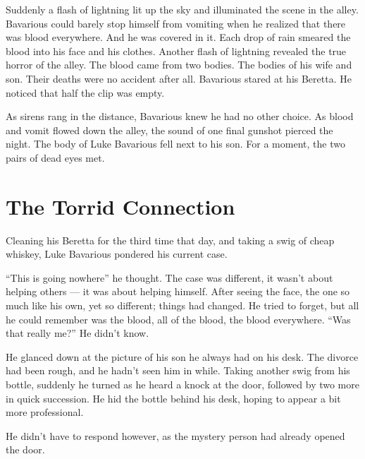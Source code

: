 Suddenly a flash of lightning lit up the sky and illuminated the
scene in the alley. Bavarious could barely stop himself from
vomiting when he realized that there was blood everywhere. And he
was covered in it. Each drop of rain smeared the blood into his
face and his clothes. Another flash of lightning revealed the true
horror of the alley. The blood came from two bodies. The bodies of
his wife and son. Their deaths were no accident after all.
Bavarious stared at his Beretta. He noticed that half the clip was
empty.



As sirens rang in the distance, Bavarious knew he had no other
choice. As blood and vomit flowed down the alley, the sound of one
final gunshot pierced the night. The body of Luke Bavarious fell
next to his son. For a moment, the two pairs of dead eyes met. 

 





\chapter{The Torrid Connection}



Cleaning his Beretta for the third time that day, and taking a swig
of cheap whiskey, Luke Bavarious pondered his current case.



``This is going nowhere'' he thought. The case was
different, it wasn't about helping others --- it was
about helping himself. After seeing the face, the one so much like
his own, yet so different; things had changed. He tried to forget,
but all he could remember was the blood, all of the blood, the
blood everywhere. ``Was that really me?'' He didn't
know.



He glanced down at the picture of his son he always had on his
desk. The divorce had been rough, and he hadn't seen him in
while. Taking another swig from his bottle, suddenly he turned as
he heard a knock at the door, followed by two more in quick
succession. He hid the bottle behind his desk, hoping to appear a
bit more professional.



He didn't have to respond however, as the mystery person had
already opened the door.




